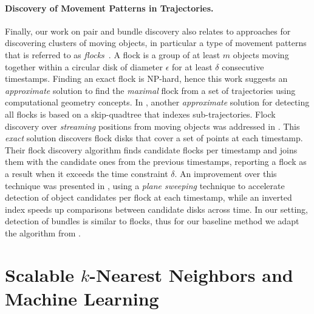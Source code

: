 \paragraph{Discovery of Movement Patterns in Trajectories.} Finally, our work on pair and bundle discovery also relates to approaches for discovering clusters of moving objects, in particular a type of movement patterns that is referred to as {\em flocks}~\cite{gudmundsson2006computing}. A flock is a group of at least $m$ objects moving together within a circular disk of diameter $\epsilon$ for at least $\delta$ consecutive timestamps. Finding an exact flock is NP-hard, hence this work suggests an \textit{approximate} solution to find the \textit{maximal} flock from a set of trajectories using computational geometry concepts. In \cite{benkert2008reporting}, another \textit{approximate} solution for detecting all flocks is based on a skip-quadtree that indexes sub-trajectories. Flock discovery over {\em streaming} positions from moving objects was addressed in \cite{vieira2009line}. This \textit{exact} solution discovers flock disks that cover a set of points at each timestamp. Their flock discovery algorithm finds candidate flocks per timestamp and joins them with the candidate ones from the previous timestamps, reporting a flock as a result when it exceeds the time constraint $\delta$. An improvement over this technique was presented in \cite{tanaka2015efficient}, using a \textit{plane sweeping} technique to accelerate detection of object candidates per flock at each timestamp, while an inverted index speeds up comparisons between candidate disks across time. In our setting, detection of bundles is similar to flocks, thus for our baseline method we adapt the algorithm from \cite{vieira2009line}.

\section{Scalable \texorpdfstring{$k$}--Nearest Neighbors and Machine Learning}
\label{sec:knn_ml}

